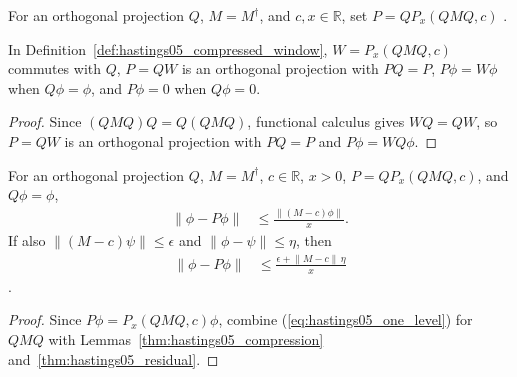 \begin{definition}
    \label{def:hastings05_compressed_window}
    \leanok
    For an orthogonal projection $Q$, $M=M^\dagger$, and $c,x\in\mathbb R$, set
    $P=QP_x(QMQ,c)$ \cite[lines 673--685]{Hastings2006Solving}.
\end{definition}

\begin{lemma}
    \label{thm:hastings05_compressed_window_projection}
    \leanok
    In Definition~\ref{def:hastings05_compressed_window}, $W=P_x(QMQ,c)$
    commutes with $Q$, $P=QW$ is an orthogonal projection with $PQ=P$,
    $P\phi=W\phi$ when $Q\phi=\phi$, and $P\phi=0$ when $Q\phi=0$.
\end{lemma}
\begin{proof}\leanok
    Since $(QMQ)Q=Q(QMQ)$, functional calculus gives $WQ=QW$, so $P=QW$ is an
    orthogonal projection with $PQ=P$ and $P\phi=WQ\phi$.
\end{proof}

\begin{lemma}
    \label{thm:hastings05_compressed_window_bound}
    \leanok
    For an orthogonal projection $Q$, $M=M^\dagger$, $c\in\mathbb R$, $x>0$,
    $P=QP_x(QMQ,c)$, and $Q\phi=\phi$,
    \begin{align}
        \lVert\phi-P\phi\rVert
         & \le \frac{\lVert(M-c)\phi\rVert}{x}.
        \label{eq:hastings05_compressed_window_bound_1}
    \end{align}
    If also $\|(M-c)\psi\|\le\epsilon$ and $\|\phi-\psi\|\le\eta$, then
    \begin{align}
        \lVert\phi-P\phi\rVert
         & \le\frac{\epsilon+\lVert M-c\rVert\,\eta}{x}
        \label{eq:hastings05_compressed_window_bound_2}
    \end{align}
    \cite[lines 673--699]{Hastings2006Solving}.
\end{lemma}
\begin{proof}\leanok
    Since $P\phi=P_x(QMQ,c)\phi$, combine (\ref{eq:hastings05_one_level}) for
    $QMQ$ with Lemmas~\ref{thm:hastings05_compression}
    and~\ref{thm:hastings05_residual}.
\end{proof}


